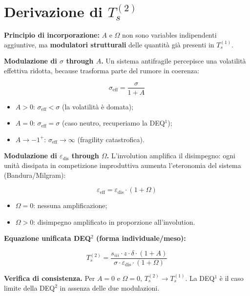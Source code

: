 \section{\texorpdfstring{Derivazione di
\(T_s^{(2)}\)}{Derivazione di T\_s\^{}\{(2)\}}}\label{followszione-di-t_s2}

\Hypoth{} \textbf{Principio di incorporazione:} \(A\) e \(\Omega\) non
sono variables indipendenti aggiuntive, ma \textbf{modulatori
strutturali} delle quantità già presenti in \(T_s^{(1)}\).

\textbf{Modulazione di \(\sigma\) through \(A\).} Un sistema antifragile
percepisce una volatilità effettiva ridotta, because trasforma parte del
rumore in coerenza:

\[
\sigma_{\text{eff}} = \frac{\sigma}{1 + A}
\]

\begin{itemize}
\tightlist
\item
  \(A > 0\): \(\sigma_{\text{eff}} < \sigma\) (la volatilità è domata);
\item
  \(A = 0\): \(\sigma_{\text{eff}} = \sigma\) (caso neutro, recuperiamo
  la DEQ$^1$);
\item
  \(A \to -1^+\): \(\sigma_{\text{eff}} \to \infty\) (fragility
  catastrofica).
\end{itemize}

\textbf{Modulazione di \(\varepsilon_{\text{dis}}\) through \(\Omega\).}
L'involution amplifica il disimpegno: ogni unità dissipata in
competizione improduttiva aumenta l'eteronomia del sistema
(Bandura/Milgram):

\[
\varepsilon_{\text{eff}} = \varepsilon_{\text{dis}} \cdot (1 + \Omega)
\]

\begin{itemize}
\tightlist
\item
  \(\Omega = 0\): nessuna amplificazione;
\item
  \(\Omega > 0\): disimpegno amplificato in proporzione all'involution.
\end{itemize}

\textbf{Equazione unificata DEQ$^2$ (forma individuale/meso):}

\[
\boxed{T_s^{(2)} = \frac{s_{iii} \cdot z \cdot \delta \cdot (1+A)}{\sigma \cdot \varepsilon_{\text{dis}} \cdot (1+\Omega)}}
\]

\Proved{} \textbf{Verifica di consistenza.} Per \(A = 0\) e
\(\Omega = 0\), \(T_s^{(2)} \to T_s^{(1)}\). La DEQ$^1$ è il caso limite
della DEQ$^2$ in assenza delle due modulazioni.



